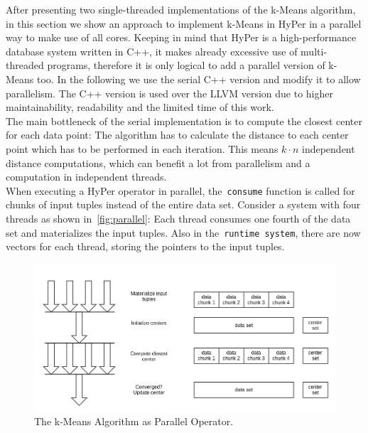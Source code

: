 After presenting two single-threaded implementations of the k-Means algorithm, in this section we show an approach to implement k-Means in HyPer in a parallel way to make use of all cores. Keeping in mind that HyPer is a high-performance database system written in C++, it makes already excessive use of multi-threaded programs, therefore it is only logical to add a parallel version of k-Means too. In the following we use the serial C++ version and modify it to allow parallelism. The C++ version is used over the LLVM version due to higher maintainability, readability and the limited time of this work.
\\
The main bottleneck of the serial implementation is to compute the closest center for each data point: The algorithm has to calculate the distance to each center point which has to be performed in each iteration. This means $k \cdot n$ independent distance computations, which can benefit a lot from parallelism and a computation in independent threads.
\\
When executing a HyPer operator in parallel, the~\texttt{consume} function is called for chunks of input tuples instead of the entire data set. Consider a system with four threads as shown in~\autoref{fig:parallel}: Each thread consumes one fourth of the data set and materializes the input tuples. Also in the~\texttt{runtime system}, there are now vectors for each thread, storing the pointers to the input tuples. 


\begin{figure}[htsb]
  \centerline{
    \includegraphics[scale=0.4]{figures/parallel_font}
  }
  \caption[The k-Means Algorithm as Parallel Operator]{The k-Means Algorithm as Parallel Operator.}
  \label{fig:parallel}
\end{figure}

